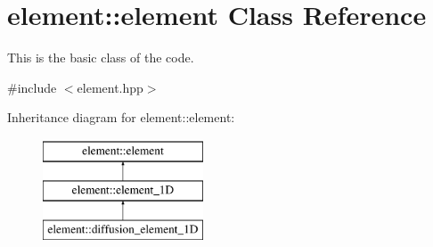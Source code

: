 \hypertarget{classelement_1_1element}{\section{element\-:\-:element Class Reference}
\label{classelement_1_1element}
}


This is the basic class of the code.  




{\ttfamily \#include $<$element.\-hpp$>$}

Inheritance diagram for element\-:\-:element\-:\begin{figure}[H]
\begin{center}
\leavevmode
\includegraphics[height=3.000000cm]{classelement_1_1element}
\end{center}
\end{figure}
